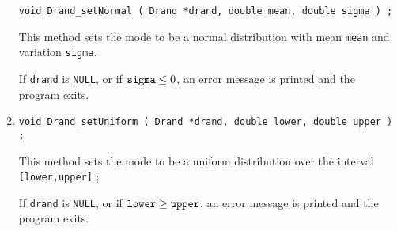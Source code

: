 \begin{enumerate}
\begin{verbatim}
void Drand_setNormal ( Drand *drand, double mean, double sigma ) ;
\end{verbatim}
This method sets the mode to be a normal distribution with mean
{\tt mean} and variation {\tt sigma}.
\par {}
If {\tt drand} is {\tt NULL},
or if ${\tt sigma} \le 0$,
an error message is printed and the program exits.
\item
\begin{verbatim}
void Drand_setUniform ( Drand *drand, double lower, double upper ) ;
\end{verbatim}
This method sets the mode to be a uniform distribution over the
interval {\tt [lower,upper]} ;
\par {}
If {\tt drand} is {\tt NULL},
or if ${\tt lower} \ge {\tt upper}$,
an error message is printed and the program exits.
\end{enumerate}
\par
